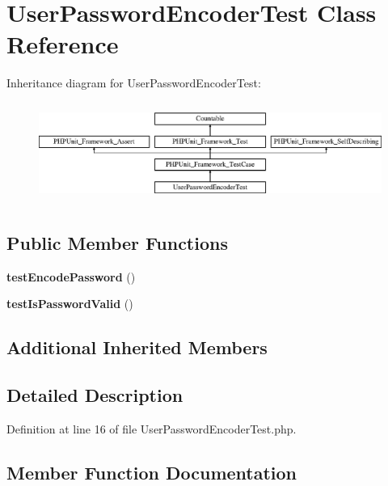 \section{User\+Password\+Encoder\+Test Class Reference}
\label{class_symfony_1_1_component_1_1_security_1_1_core_1_1_tests_1_1_encoder_1_1_user_password_encoder_test}
Inheritance diagram for User\+Password\+Encoder\+Test\+:\begin{figure}[H]
\begin{center}
\leavevmode
\includegraphics[height=3.303835cm]{class_symfony_1_1_component_1_1_security_1_1_core_1_1_tests_1_1_encoder_1_1_user_password_encoder_test}
\end{center}
\end{figure}
\subsection*{Public Member Functions}
\begin{DoxyCompactItemize}
\item 
{\bf test\+Encode\+Password} ()
\item 
{\bf test\+Is\+Password\+Valid} ()
\end{DoxyCompactItemize}
\subsection*{Additional Inherited Members}


\subsection{Detailed Description}


Definition at line 16 of file User\+Password\+Encoder\+Test.\+php.



\subsection{Member Function Documentation}
